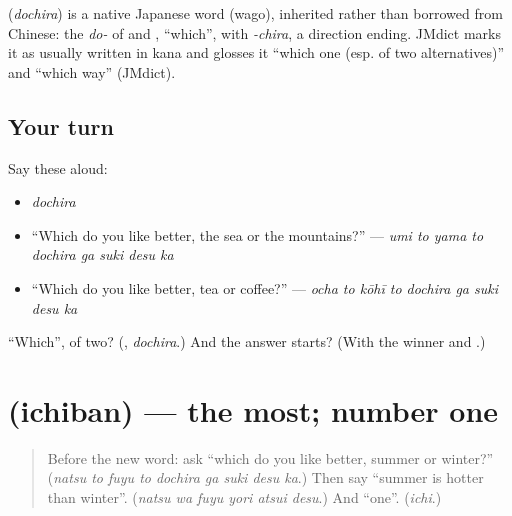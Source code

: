 \begin{cousinweb}
\textbf{} (\emph{dochira}) is a native Japanese word (wago), inherited rather than borrowed from Chinese: the \emph{do-} of \textbf{} and \textbf{}, \textquotedblleft{}which\textquotedblright{}, with \emph{-chira}, a direction ending. JMdict marks it as usually written in kana and glosses it \textquotedblleft{}which one (esp. of two alternatives)\textquotedblright{} and \textquotedblleft{}which way\textquotedblright{} (JMdict).
\end{cousinweb}

\subsection*{Your turn}
Say these aloud:

\begin{itemize}
\raggedright
  \item \emph{dochira}
  \item \textquotedblleft{}Which do you like better, the sea or the mountains?\textquotedblright{} — \emph{umi to yama to dochira ga suki desu ka}
  \item \textquotedblleft{}Which do you like better, tea or coffee?\textquotedblright{} — \emph{ocha to kōhī to dochira ga suki desu ka}
\end{itemize}

\begin{tcolorbox}[breakable,colback=teal!4,colframe=teal!35!black,title={Before you move on}]
\textquotedblleft{}Which\textquotedblright{}, of two? (\textbf{}, \emph{dochira}.) And the answer starts? (With the winner and \textbf{ }.)
\end{tcolorbox}
\section[\texorpdfstring{\ja{いちばん} (ichiban)}{いちばん (ichiban)}]{ (ichiban) — the most; number one}

\label{lesson:JA-C259-ichiban}



\begin{quote}
Before the new word: ask \textquotedblleft{}which do you like better, summer or winter?\textquotedblright{} (\emph{natsu to fuyu to dochira ga suki desu ka}.) Then say \textquotedblleft{}summer is hotter than winter\textquotedblright{}. (\emph{natsu wa fuyu yori atsui desu}.) And \textquotedblleft{}one\textquotedblright{}. (\emph{ichi}.)
\end{quote}

